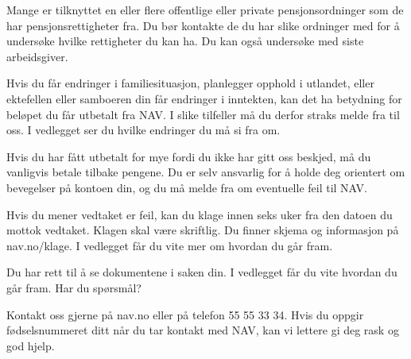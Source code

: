 \begin{letter}{\brevparameter}
        Mange er tilknyttet en eller flere offentlige eller private pensjonsordninger som de har
        pensjonsrettigheter fra. Du bør kontakte de du har slike ordninger med for å undersøke hvilke
        rettigheter du kan ha. Du kan også undersøke med siste arbeidsgiver.

        Hvis du får endringer i familiesituasjon, planlegger opphold i utlandet, eller ektefellen eller
        samboeren din får endringer i inntekten, kan det ha betydning for beløpet du får utbetalt fra NAV.
        I slike tilfeller må du derfor straks melde fra til oss. I vedlegget ser du hvilke endringer du må si
        fra om.

        \par Hvis du har fått utbetalt for mye fordi du ikke har gitt oss beskjed, må du vanligvis betale tilbake
        pengene. Du er selv ansvarlig for å holde deg orientert om bevegelser på kontoen din, og du må
        melde fra om eventuelle feil til NAV.

        Hvis du mener vedtaket er feil, kan du klage innen seks uker fra den datoen du mottok vedtaket.
        Klagen skal være skriftlig. Du finner skjema og informasjon på nav.no/klage.
        I vedlegget får du vite mer om hvordan du går fram.



        \par Du har rett til å se dokumentene i saken din. I vedlegget får du vite hvordan du går fram.
        Har du spørsmål?

        \par Kontakt oss gjerne på nav.no eller på telefon 55 55 33 34.
        Hvis du oppgir fødselsnummeret ditt når du tar kontakt med NAV, kan vi lettere gi deg rask og god hjelp.

    \end{letter}
